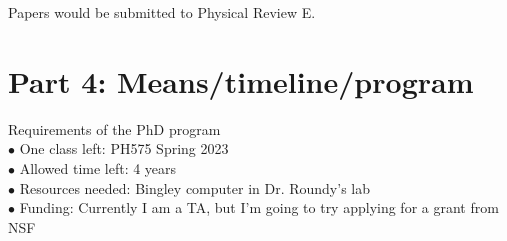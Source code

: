 \documentclass[double,12pt]{revtex4-2}
\begin{document}
\noindent Papers would be submitted to Physical Review E.

\section{Part 4: Means/timeline/program}
\noindent Requirements of the PhD program \\
$\bullet$ One class left: PH575 Spring 2023 \\
$\bullet$ Allowed time left: 4 years \\
$\bullet$ Resources needed: Bingley computer in Dr. Roundy's lab \\
$\bullet$ Funding: Currently I am a TA, but I'm going to try applying for a grant from NSF \\
\end{document}
